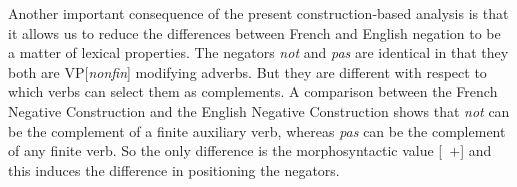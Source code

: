 \documentclass[output=paper
                ,modfonts
		,nonflat
	        ,collection
	        ,collectionchapter
	        ,collectiontoclongg
 	        ,biblatex  
                ,babelshorthands
                ,newtxmath
                ,draftmode
                ,colorlinks, citecolor=brown 
]{./langsci/langscibook}
\begin{document}
{\begin{exe}
\begin{xlist}
\begin{exe}
\begin{xlist}
\eal
{}
\zl

Another important consequence of the present construction-based analysis
is that it allows us to reduce the differences between
French and English negation to be a matter of lexical properties.
The negators \emph{not} and \emph{pas} are identical in that they both are
VP[\emph{nonfin}] modifying adverbs. But they are different with respect to
which verbs can select them as complements.
A comparison between the French Negative Construction and
the English  Negative Construction shows that \emph{not} can be the
complement of a finite auxiliary verb, whereas \emph{pas} can be the
complement of any finite verb.  So the only difference
is the morphosyntactic value [\AUX\ $+$] and this induces
the difference in positioning the negators.



%




%


\end{xlist}
\end{exe}
\end{xlist}
\end{exe}}
\end{document}
